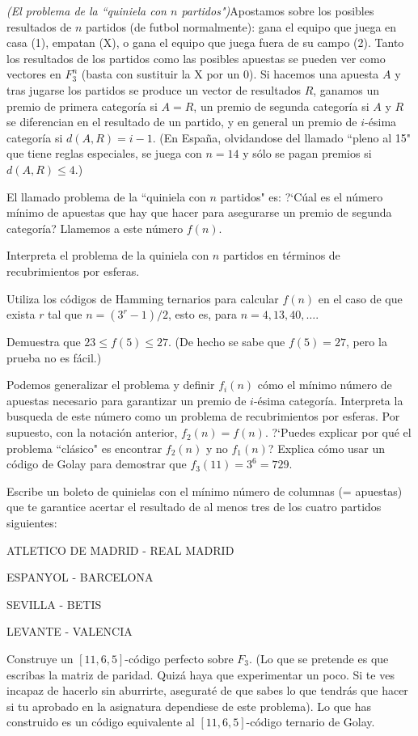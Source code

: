 \begin{problem}[14]
{\it (El problema de la ``quiniela con $n$
partidos")}Apostamos sobre los posibles resultados de $n$ partidos
(de futbol normalmente): gana el equipo que juega en casa (1),
empatan (X), o gana el equipo que juega fuera de su campo (2).
Tanto los resultados de los partidos como las posibles apuestas se
pueden ver como vectores en $ F_3^{n}$ (basta con sustituir la X
por un $0$). Si hacemos una apuesta $A$ y tras jugarse los
partidos se produce un vector de resultados $R$, ganamos un premio
de primera categoría si $A=R$, un premio de segunda categoría si
$A$ y $R$ se diferencian en el resultado de un partido, y en
general un premio de $i$-ésima categoría si $d(A,R)=i-1$. (En
España, olvidandose del llamado ``pleno al 15" que tiene reglas
especiales, se juega con $n=14$ y sólo se pagan premios si
$d(A,R)\le 4$.)

El llamado problema de la ``quiniela con $n$ partidos" es: ?`Cúal
es el número mínimo de apuestas que hay que hacer para asegurarse
un premio de segunda categoría? Llamemos a este número $f(n)$.

\ppart  Interpreta el problema de la quiniela con $n$ partidos en
términos de recubrimientos por esferas.

\ppart Utiliza los códigos de Hamming ternarios para calcular $f(n)$
en el caso de que exista $r$ tal que $n=(3^r-1)/2$, esto es, para
$n=4,13,40,\dots$.

\ppart Demuestra que $23\le f(5)\le 27$. (De hecho se sabe que
$f(5)=27$, pero la prueba no es fácil.)

\ppart Podemos generalizar el problema y definir $f_i(n)$ cómo el
mínimo número de apuestas necesario para garantizar un premio de
$i$-ésima categoría. Interpreta la busqueda de este número como un
problema de recubrimientos por esferas. Por supuesto, con la
notación anterior, $f_2(n)=f(n)$. ?`Puedes explicar por qué el
problema ``clásico" es encontrar $f_2(n)$ y no $f_1(n)$? Explica
cómo usar un código de Golay para demostrar que $f_3
(11)=3^6=729$.

\ppart Escribe un boleto de quinielas con el mínimo número de columnas
(= apuestas) que te garantice acertar el resultado de al menos
tres de los cuatro partidos siguientes:

ATLETICO DE MADRID - REAL MADRID

ESPANYOL - BARCELONA

SEVILLA - BETIS

LEVANTE - VALENCIA


\solution
\end{problem}


\begin{problem}[16]
 Construye un $[11,6,5]$-código perfecto sobre $ F_3$. (Lo
que se pretende es que escribas la matriz de paridad. Quizá haya
que experimentar un poco. Si te ves incapaz de hacerlo sin
aburrirte, aseguraté de que sabes lo que tendrás que hacer si tu
aprobado en la asignatura dependiese de este problema). Lo que has
construido es un código equivalente al $[11,6,5]$-código ternario
de Golay.
\solution
\end{problem}